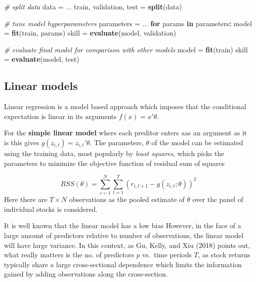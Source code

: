 \documentclass[]{article}
\newenvironment{Shaded}{\begin{snugshade}}{\end{snugshade}}
\newcommand{\CommentTok}[1]{\textcolor[rgb]{0.56,0.35,0.01}{\textit{#1}}}
\newcommand{\ControlFlowTok}[1]{\textcolor[rgb]{0.13,0.29,0.53}{\textbf{#1}}}
\newcommand{\KeywordTok}[1]{\textcolor[rgb]{0.13,0.29,0.53}{\textbf{#1}}}
\newcommand{\NormalTok}[1]{#1}
\newcommand{\OperatorTok}[1]{\textcolor[rgb]{0.81,0.36,0.00}{\textbf{#1}}}
\newcommand{\StringTok}[1]{\textcolor[rgb]{0.31,0.60,0.02}{#1}}
\begin{document}
\begin{Shaded}
\begin{Highlighting}[]
\CommentTok{# split data}
\NormalTok{data =}\StringTok{ }\NormalTok{...}
\NormalTok{train, validation, test =}\StringTok{ }\KeywordTok{split}\NormalTok{(data)}

\CommentTok{# tune model hyperparameters}
\NormalTok{parameters =}\StringTok{ }\NormalTok{...}
\ControlFlowTok{for}\NormalTok{ params }\ControlFlowTok{in}\NormalTok{ parameters}\OperatorTok{:}
\StringTok{    }\NormalTok{model =}\StringTok{ }\KeywordTok{fit}\NormalTok{(train, params)}
\NormalTok{    skill =}\StringTok{ }\KeywordTok{evaluate}\NormalTok{(model, validation)}

\CommentTok{# evaluate final model for comparison with other models}
\NormalTok{model =}\StringTok{ }\KeywordTok{fit}\NormalTok{(train)}
\NormalTok{skill =}\StringTok{ }\KeywordTok{evaluate}\NormalTok{(model, test)}
\end{Highlighting}
\end{Shaded}

\hypertarget{linear-models}{%
\subsection{Linear models}\label{linear-models}}

Linear regression is a model based approach which imposes that the
conditional expectation is linear in its arguments \(f(x) = x'\theta\).

For the \textbf{simple linear model} where each preditor enters aas an
argument as it is this gives \(g(z_{i,t}) =z_{i,t}' \theta\). The
parameters, \(\theta\) of the model can be estimated using the training
data, most popularly by \emph{least squares}, which picks the parameters
to minimize the objective function of residual sum of squares

\[RSS(\theta) = \sum_{i=1}^N\sum_{t=1}^T (r_{i,t+1} - g(z_{i,t};\theta) )^2\]
Here there are \(T\times N\) observations as the pooled estimate of
\(\theta\) over the panel of individual stocks is considered.

It is well known that the linear model has a low bias However, in the
face of a large amount of predictors relative to number of observations,
the linear model will have large variance. In this context, as Gu,
Kelly, and Xiu (2018) points out, what really matters is the no. of
predictors \(p\) vs.~time periods \(T\), as stock returns typically
share a large cross-sectional dependence which limits the information
gained by adding observations along the cross-section.
\end{document}
